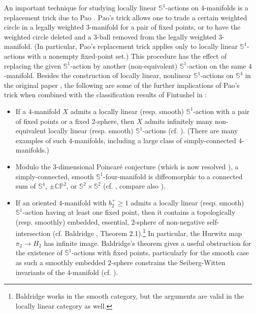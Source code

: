 \documentclass[11pt]{amsart}
\theoremstyle{plain}
\numberwithin{theorem}{section}
\theoremstyle{definition}
\begin{document}
An important technique for studying locally linear ${{\mathbb S}}^1$-actions on $4$-manifolds is a replacement
trick due to Pao \cite{Pao}. Pao's trick allows one to trade a certain weighted circle in a legally weighted
$3$-manifold for a pair of fixed points, or to have the weighted circle deleted and a $3$-ball removed
from the legally weighted $3$-manifold. (In particular, Pao's replacement trick applies only to locally 
linear ${{\mathbb S}}^1$-actions with a nonempty fixed-point set.) This procedure has the effect of replacing the 
given ${{\mathbb S}}^1$-action by another (non-equivalent) ${{\mathbb S}}^1$-action on the same $4$-manifold. Besides the 
construction of locally linear, nonlinear ${{\mathbb S}}^1$-actions on ${{\mathbb S}}^4$ in the original paper \cite{Pao}, the 
following are some of the further implications of Pao's trick when combined with the classification 
results of Fintushel in \cite{F0,F1,F2}:

\begin{itemize}
\item If a $4$-manifold $X$ admits a locally linear (resp. smooth) ${{\mathbb S}}^1$-action with a pair of fixed 
points or a fixed $2$-sphere, then $X$ admits infinitely many non-equivalent locally linear (resp. smooth) 
${{\mathbb S}}^1$-actions (cf. \cite{Pao}). (There are many examples of such $4$-manifolds, including a large 
class of simply-connected $4$-manifolds.)
\item Modulo the $3$-dimensional Poincar\'{e} conjecture (which is now resolved \cite{P}), 
a simply-connected, smooth ${{\mathbb S}}^1$-four-manifold is diffeomorphic to a connected sum of ${{\mathbb S}}^4$,
$\pm {{\mathbb C}}{{\mathbb P}}^2$, or ${{\mathbb S}}^2\times{{\mathbb S}}^2$ (cf. \cite{F2}, compare also \cite{Y}).
\item If an oriented $4$-manifold with $b_2^{+}\geq 1$ admits a locally linear (resp. smooth) ${{\mathbb S}}^1$-action having at least one fixed point, then it contains a topologically (resp. smoothly) embedded, essential,
$2$-sphere of non-negative self-intersection (cf. Baldridge \cite{Bald1}, Theorem 2.1).\footnote{Baldridge \cite{Bald1} works in the smooth category, but the arguments are valid in the locally linear category as well.} In particular, the Hurwitz map $\pi_2\rightarrow H_2$ has infinite image. Baldridge's theorem gives a useful obstruction for the existence of ${{\mathbb S}}^1$-actions with fixed points, particularly for the smooth case as such a smoothly embedded $2$-sphere constrains the Seiberg-Witten invariants of the $4$-manifold (cf. \cite{FS}). 
\end{itemize}
\end{document}
